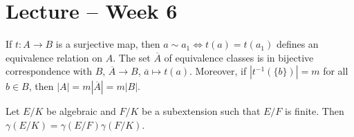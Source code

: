 \section{Lecture -- Week 6}

If $t\colon A\to B$ is a surjective map, then 
$a\sim a_1\Longleftrightarrow t(a)=t(a_1)$ 
defines an equivalence relation on $A$. The set $\overline{A}$ 
of equivalence classes is in bijective correspondence with $B$,
$\overline{A}\to B$, $\overline{a}\mapsto t(a)$. 
Moreover, if $|t^{-1}(\{b\})|=m$ for all $b\in B$, then 
$|A|=m|\overline{A}|=m|B|$. 

\begin{proposition}
    Let $E/K$ be algebraic and $F/K$ be a subextension such that 
    $E/F$ is finite. Then $\gamma(E/K)=\gamma(E/F)\gamma(F/K)$. 
\end{proposition}

